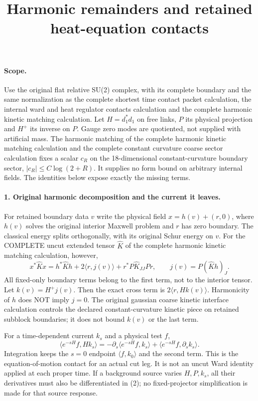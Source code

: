\documentclass[11pt]{article}
\title{Harmonic remainders and retained heat-equation contacts}\author{}\date{}
\begin{document}
\maketitle
\paragraph{Scope.}
Use the original flat relative SU(2) complex, with its complete boundary
and the same normalization as the complete shortest time contact packet calculation, the internal ward and heat regulator contacts calculation and the complete harmonic kinetic matching calculation. Let $H=d_1^*d_1$ on free
links, $P$ its physical projection and $H^+$ its inverse on $P$.
Gauge zero modes are quotiented, not supplied with artificial mass.
The harmonic matching of the complete harmonic kinetic matching calculation and the complete constant curvature coarse sector calculation fixes a scalar $c_R$ on the
18-dimensional constant-curvature boundary sector,
$|c_R|\le C\log(2+R)$. It supplies no form bound on arbitrary internal
fields. The identities below expose exactly the missing terms.

\paragraph{1. Original harmonic decomposition and the current it leaves.}
For retained boundary data $v$ write the physical field
$x=h(v)+(r,0)$, where $h(v)$ solves the original interior Maxwell
problem and $r$ has zero boundary. The classical energy splits
orthogonally, with its original Schur energy on $v$. For the COMPLETE
uncut extended tensor $\widehat K$ of the complete harmonic kinetic matching calculation, however,
\[
 x^*\widehat Kx=h^*\widehat Kh+2\langle r,j(v)\rangle
                         +r^*P\widehat K_{JJ}Pr,
 \qquad j(v)=P(\widehat Kh)_J.                         \tag{1}
\]
All fixed-only boundary terms belong to the first term, not to the
interior tensor. Let $k(v)=H^+j(v)$. Then the exact cross term is
$2\langle r,Hk(v)\rangle$. Harmonicity of $h$ does NOT imply $j=0$.
The original gaussian coarse kinetic interface calculation controls the declared constant-curvature kinetic piece on
retained subblock boundaries; it does not bound $k(v)$ or the last term.

For a time-dependent current $k_s$ and a physical test $f$,
\[
 \langle e^{-sH}f,Hk_s\rangle
 =-\partial_s\langle e^{-sH}f,k_s\rangle
                       +\langle e^{-sH}f,\partial_s k_s\rangle. \tag{2}
\]
Integration keeps the $s=0$ endpoint $\langle f,k_0\rangle$ and the
second term. This is the equation-of-motion contact for an actual cut
leg. It is not an uncut Ward identity applied at each proper time.
If a background source varies $H,P,k_s$, all their derivatives must
also be differentiated in (2); no fixed-projector simplification is
made for that source response.
\end{document}
